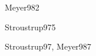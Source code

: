 \begin{syllabus}
\begin{unit}{\PLFOURDef}{Meyer98}{2}
   \begin{topics}
      \item \PLFOURTopicLa
      \item \PLFOURTopicDeclaracion
      \item \PLFOURTopicVista
      \item \PLFOURTopicRecoleccion
   \end{topics}

   \begin{unitgoals}
      \item \PLFOURObjONE
      \item \PLFOURObjTWO
      \item \PLFOURObjTHREE
      \item \PLFOURObjFOUR
      \item \PLFOURObjFIVE
      \item \PLFOURObjSIX
   \end{unitgoals}
\end{unit}

\begin{unit}{\PLFIVEDef}{Stroustrup97}{5}
   \begin{topics}
      \item \PLFIVETopicProcedimientos
      \item \PLFIVETopicMecanismos
      \item \PLFIVETopicRegistros
      \item \PLFIVETopicParametros
      \item \PLFIVETopicModulos
   \end{topics}

   \begin{unitgoals}
      \item \PLFIVEObjONE
      \item \PLFIVEObjTWO
      \item \PLFIVEObjTHREE
      \item \PLFIVEObjFOUR
   \end{unitgoals}
\end{unit}

\begin{unit}{\PLSIXDef}{Stroustrup97, Meyer98}{7}
   \begin{topics}
      \item \PLSIXTopicDiseno
      \item \PLSIXTopicEncapsulacion
      \item \PLSIXTopicSeparacion
      \item \PLSIXTopicClases
      \item \PLSIXTopicHerencia
      \item \PLSIXTopicPolimorfismo
      \item \PLSIXTopicJerarquias
      \item \PLSIXTopicColeccion
      \item \PLSIXTopicRepresentaciones
   \end{topics}


\end{unit}
\end{syllabus}
